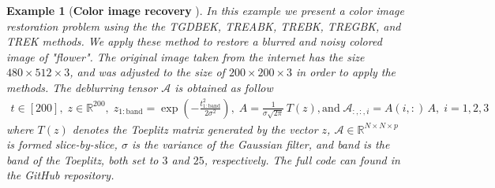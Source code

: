\documentclass[11pt]{article}
\newtheorem{example}[theorem]{Example}
\def\fm#1{\mathcal{#1}}
\begin{document}
\begin{example}[\textbf{Color image recovery }] In this example we present a color image restoration problem using the the TGDBEK, TREABK, TREBK, TREGBK, and TREK methods. We apply these method to restore a blurred and noisy colored image of "flower". The original image taken from  the internet has the size $480\times 512\times 3$, and was adjusted to the size of $200 \times 200\times 3$ in order to apply the methods.  The deblurring tensor $\fm A$ is obtained  as follow
\begin{align*}
t\in [200], \; z \in \mathbb{R}^{200}, \; z_{1:\text{band}} = \exp\!\left(-\frac{t_{1:\text{band}}^{2}}{2\sigma^{2}}\right),\; A =  \frac{1}{\sigma\sqrt{2\pi}}\,T(z),\text{and} \; \fm{A}_{:,:,i} = A(i,:)\,A,\; i=1,2,3 \label{eq:Aslices}
\end{align*}
where $T(z)$ denotes the Toeplitz matrix generated by the vector $z$,
$\fm {A}\in\mathbb{R}^{N\times N\times p}$ is formed slice-by-slice, $\sigma$ is the variance of the Gaussian filter, and band is the band of the Toeplitz, both set to $3$ and $25$, respectively. The full code can found in the GitHub repository. 


\end{example}
\end{document}

